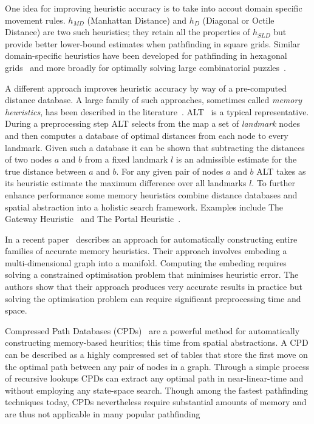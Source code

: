 One idea for improving heuristic accuracy is to take into accout domain specific movement rules.
$h_{MD}$ (Manhattan Distance) and $h_D$ (Diagonal or Octile Distance) are two such heuristics; they
retain all the properties of $h_{SLD}$ but provide better lower-bound estimates when pathfinding in
square grids. Similar domain-specific heuristics have been developed for pathfinding in hexagonal
grids~\citep{yap02} and more broadly for optimally solving large combinatorial puzzles~\citep{korf96}.

A different approach improves heuristic accuracy by way of a pre-computed distance database.  
A large family of such approaches, sometimes called \emph{memory heuristics}, has been
described in the literature~\citep{goldberg05,bjornsson06,sturtevant07,felner09,goldenberg10}.
ALT~\citep{goldberg05} is a typical representative. During a preprocessing step ALT selects from the
map a set of \emph{landmark} nodes and then computes a database of optimal distances from each node
to every landmark. Given such a database it can be shown that subtracting the distances of two nodes
$a$ and $b$ from a fixed landmark $l$ is an admissible estimate for the true distance between 
$a$ and $b$. For any given pair of nodes $a$ and $b$ ALT takes as its heuristic estimate the maximum 
difference over all landmarks $l$.
To further enhance performance some memory heuristics combine distance databases and 
spatial abstraction into a holistic search framework. Examples include 
The Gateway Heuristic~\citep{bjornsson06} and The Portal Heuristic~\citep{goldenberg10}.

In a recent paper~\cite{rayner11} describes an approach for automatically constructing entire families of 
accurate memory heuristics. Their approach involves embeding a multi-dimensional graph into
a manifold. Computing the embeding requires solving a constrained optimisation 
problem that minimises heuristic error. The authors show that their approach produces very accurate
results in practice but solving the optimisation problem can require significant preprocessing 
time and space.

Compressed Path Databases (CPDs)~\citep{sanka05,botea11,botea13} are a powerful method 
for automatically constructing memory-based heuritics; this time from spatial abstractions. 
A CPD can be described as a highly compressed set of tables that store the first move on the optimal 
path between any pair of nodes in a graph. Through a simple process of recursive lookups 
CPDs can extract any optimal path in near-linear-time and without employing any state-space 
search. Though among the fastest pathfinding techniques today, CPDs nevertheless require
substantial amounts of memory and are thus not applicable in many popular pathfinding 

